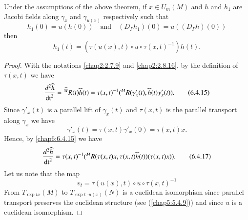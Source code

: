 \begin{lemma*}
Under the assumptions of the above theorem, if $x\in U_{m}(M)$ and $h$
and $h_{1}$ are Jacobi fields along $\gamma_{x}$ and $\gamma_{u(x)}$
respectively such that
\begin{equation*}
h_{1}(0)=u(h(0))\quad\text{and}\quad
(D_{P}h_{1})(0)=u((D_{P}h)(0))\tag{6.4.14}\label{chap6:6.4.14} 
\end{equation*}
then
$$
h_{1}(t)=(\tau(u(x),t)\circ u\circ \tau(x,t)^{-1})h(t).
$$
\end{lemma*}

\begin{proof}
With \pageoriginale the notations \eqref{chap2:2.7.9} and \eqref{chap2:2.8.16}, by
the definition of $\tau(x,t)$ we have
\begin{equation*}
\frac{d^{2}\widehat{h}}{\operatorname{dt}^{2}}={}^{\widehat{M}}R(t)\widehat{h}(t)=\tau(x,t)^{-1}({}^{M}R(\gamma'_{x}(t),\widehat{h}(t)\gamma'_{x}(t)).\tag{6.4.15}\label{chap6:6.4.15} 
\end{equation*}
Since $\gamma'_{x}(t)$ is a parallel lift of $\gamma_{x}(t)$ and
$\tau(x,t)$ is the parallel transport along $\gamma_{x}$ we have
\begin{equation*}
\gamma'_{x}(t)=\tau(x,t)\gamma'_{x}(0)=\tau(x,t)x.\tag{6.4.16}\label{chap6:6.4.16}
\end{equation*}
Hence, by \eqref{chap6:6.4.15} we have
\begin{equation*}
\frac{d^{2}\widehat{h}}{\operatorname{dt}^{2}}=\tau(x,t)^{-1}({}^{M}R(\tau(x,t)x,\tau(x,t)\widehat{h}(t))(\tau(x,t)x)).\tag{6.4.17}\label{chap6:6.4.17} 
\end{equation*}
Let us note that the map
\begin{equation*}
v_{t}=\tau(u(x),t)\circ u\circ \tau(x,t)^{-1}\tag{6.4.18}\label{chap6:6.4.18}
\end{equation*}
From $T_{\exp tx}(M)$ to $T_{\exp t\cdot u(x)}(N)$ is a euclidean
isomorphism since parallel transport preserves the euclidean structure
(see (\ref{chap5:5.4.9})) and since $u$ is a euclidean isomorphism.


\end{proof}
